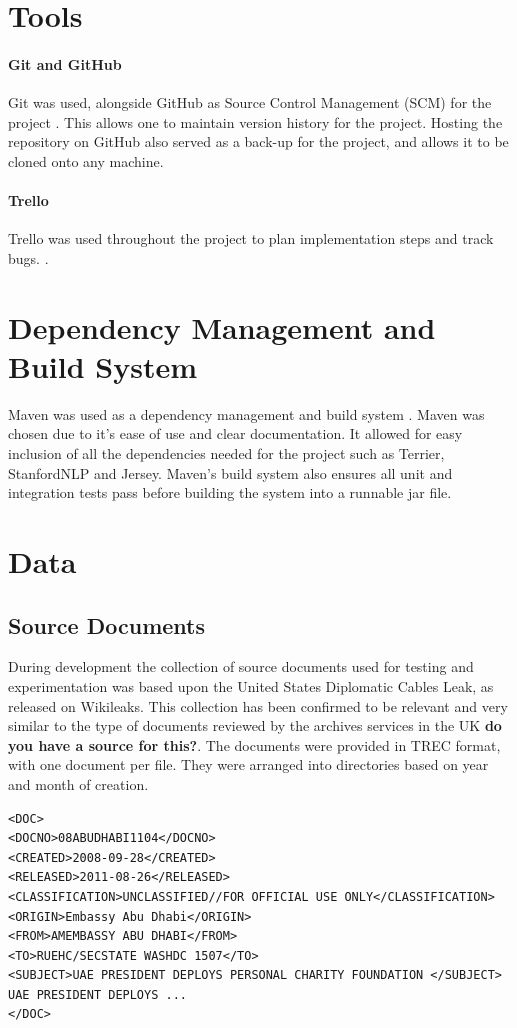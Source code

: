 \documentclass{l4proj}
\begin{document}
\section{Tools}
\paragraph{Git and GitHub}
Git was used, alongside GitHub as Source Control Management (SCM) for the project \cite{git} \cite{github}. This allows one to maintain version history for the project. Hosting the repository on GitHub also served as a back-up for the project, and allows it to be cloned onto any machine.
\paragraph{Trello}
Trello was used throughout the project to plan implementation steps and track bugs. \cite{trello}.
\section{Dependency Management and Build System}
Maven was used as a dependency management and build system \cite{maven}. Maven was chosen due to it's ease of use and clear documentation. It allowed for easy inclusion of all the dependencies needed for the project such as Terrier, StanfordNLP and Jersey. Maven's build system also ensures all unit and integration tests pass before building the system into a runnable jar file.

\section{Data}
\subsection{Source Documents}
During development the collection of source documents used for testing and experimentation was based upon the United States Diplomatic Cables Leak, as released on Wikileaks. This collection has been confirmed to be relevant and very similar to the type of documents reviewed by the archives services in the UK \textbf{do you have a source for this?}. The documents were provided in TREC format, with one document per file. They were arranged into directories based on year and month of creation.
\begin{verbatim}
<DOC>
<DOCNO>08ABUDHABI1104</DOCNO>
<CREATED>2008-09-28</CREATED>
<RELEASED>2011-08-26</RELEASED>
<CLASSIFICATION>UNCLASSIFIED//FOR OFFICIAL USE ONLY</CLASSIFICATION>
<ORIGIN>Embassy Abu Dhabi</ORIGIN>
<FROM>AMEMBASSY ABU DHABI</FROM>
<TO>RUEHC/SECSTATE WASHDC 1507</TO>
<SUBJECT>UAE PRESIDENT DEPLOYS PERSONAL CHARITY FOUNDATION </SUBJECT>
UAE PRESIDENT DEPLOYS ...
</DOC>
\end{verbatim}
\end{document}
